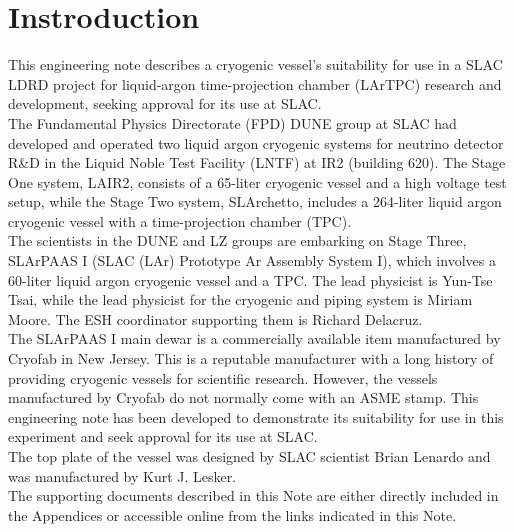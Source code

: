 \section{Instroduction}
\label{sec:intro}

This engineering note describes a cryogenic vessel's suitability for use in 
a SLAC LDRD project for liquid-argon time-projection chamber (LArTPC) research
and development,
seeking approval for its use at SLAC.\\

The Fundamental Physics Directorate (FPD) DUNE group at SLAC had developed 
and operated two liquid argon cryogenic systems for neutrino detector R\&D
in the Liquid Noble Test Facility (LNTF) at IR2 (building 620).
The Stage One system, LAIR2, consists of a 65-liter cryogenic vessel and
a high voltage test setup,
while the Stage Two system, SLArchetto, includes a 264-liter liquid argon
cryogenic vessel with a time-projection chamber (TPC).\\

The scientists in the DUNE and LZ groups are embarking on Stage Three,
SLArPAAS I (SLAC (LAr) Prototype Ar Assembly System I),
which involves a 60-liter liquid argon cryogenic vessel and a TPC.
The lead physicist is Yun-Tse Tsai, while the lead physicist for the cryogenic
and piping system is Miriam Moore.
The ESH coordinator supporting them is Richard Delacruz.\\

The SLArPAAS I main dewar is a commercially available item manufactured by Cryofab
in New Jersey.
This is a reputable manufacturer with a long history of providing cryogenic vessels 
for scientific research. 
However, the vessels manufactured by Cryofab do not normally come with an ASME stamp. 
This engineering note has been developed to demonstrate its suitability for use in 
this experiment and seek approval for its use at SLAC.\\

The top plate of the vessel was designed by SLAC scientist Brian Lenardo
and was manufactured by Kurt J. Lesker.\\

The supporting documents described in this Note are either directly included in 
the Appendices or accessible online from the links indicated in this Note.\\
